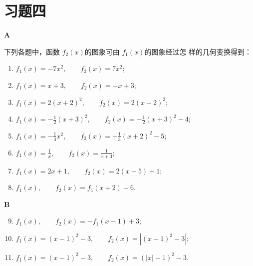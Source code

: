 \begin{analyze}
\begin{enumerate}[(1)]
\begin{figure}[htp]
    \caption{}
\end{figure}    
\end{enumerate}
\end{analyze}

\section*{习题四}
\begin{center}
    \bfseries A
\end{center}

下列各题中，函数
$f_2(x)$的图象可由
$f_1(x)$的图象经过怎
样的几何变换得到：
\begin{enumerate}[(1)]
    \item $f_1(x)=-7x^2,\qquad f_2(x)=7x^2$;
    \item $f_{1}(x)=x+3,\qquad f_{2}(x)=-x+3$;
    \item $f_{1}(x)=2(x+2)^{2},\qquad f_{2}(x)=2(x-2)^{2}$;
    \item $f_{1}(x)=-\frac{1}{2}(x+3)^{2},\qquad f_{2}(x)=-\frac{1}{2}(x+3)^{2}-4$;
    \item $f_{1}(x)=-\frac{1}{3}x^{2},\qquad f_{2}(x)=-\frac{1}{3}(x+2)^{2}-5$;
    \item $f_{1}(x)=\frac{1}{x},\qquad f_{2}(x)=\frac{1}{x+3}$;
    \item $f_{1}(x)=2x+1,\qquad f_{2}(x)=2(x-5)+1$;
    \item $ f_{1}(x),\qquad f_{2}(x)=f_{1}(x+2)+6$.
\end{enumerate}

\begin{center}
    \bfseries B
\end{center}
\begin{enumerate}[(1)]\setcounter{enumi}{8}
    \item $f_{1}(x),\qquad f_{2}(x)=-f_{1}(x-1)+3$;
    \item $f_{1}(x)=(x-1)^{2}-3,\qquad f_{2}(x)=|(x-1)^{2}-3|$;
    \item $f_{1}(x)=(x-1)^{2}-3,\qquad f_{2}(x)=(| x|-1)^{2}-3$.
\end{enumerate}

